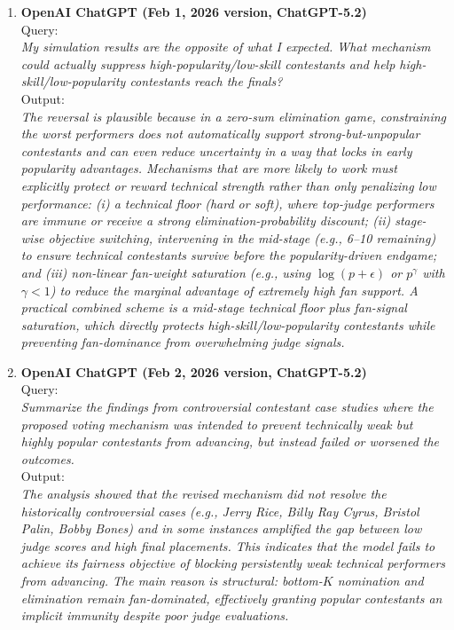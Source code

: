 \documentclass[12pt]{article}
\begin{document}
\begin{enumerate}
	\item \textbf{OpenAI ChatGPT (Feb 1, 2026 version, ChatGPT-5.2)}\\
	Query: \\
	\textit{My simulation results are the opposite of what I expected. What mechanism could actually suppress high-popularity/low-skill contestants and help high-skill/low-popularity contestants reach the finals?}\\
	Output: \\
	\textit{The reversal is plausible because in a zero-sum elimination game, constraining the worst performers does not automatically support strong-but-unpopular contestants and can even reduce uncertainty in a way that locks in early popularity advantages. Mechanisms that are more likely to work must explicitly protect or reward technical strength rather than only penalizing low performance: (i) a technical floor (hard or soft), where top-judge performers are immune or receive a strong elimination-probability discount; (ii) stage-wise objective switching, intervening in the mid-stage (e.g., 6--10 remaining) to ensure technical contestants survive before the popularity-driven endgame; and (iii) non-linear fan-weight saturation (e.g., using \(\log(p+\epsilon)\) or \(p^\gamma\) with \(\gamma<1\)) to reduce the marginal advantage of extremely high fan support. A practical combined scheme is a mid-stage technical floor plus fan-signal saturation, which directly protects high-skill/low-popularity contestants while preventing fan-dominance from overwhelming judge signals.}
	
	\item \textbf{OpenAI ChatGPT (Feb 2, 2026 version, ChatGPT-5.2)}\\
	Query: \\
	\textit{Summarize the findings from controversial contestant case studies where the proposed voting mechanism was intended to prevent technically weak but highly popular contestants from advancing, but instead failed or worsened the outcomes.}\\
	Output: \\
	\textit{The analysis showed that the revised mechanism did not resolve the historically controversial cases (e.g., Jerry Rice, Billy Ray Cyrus, Bristol Palin, Bobby Bones) and in some instances amplified the gap between low judge scores and high final placements. This indicates that the model fails to achieve its fairness objective of blocking persistently weak technical performers from advancing. The main reason is structural: bottom-$K$ nomination and elimination remain fan-dominated, effectively granting popular contestants an implicit immunity despite poor judge evaluations.}
	

\end{enumerate}
\end{document}
